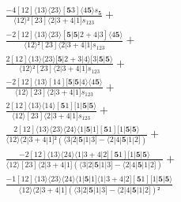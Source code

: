 \documentclass[varwidth, border=5pt]{standalone}
\begin{document}
\begin{my}
$\begin{gathered}
\scriptscriptstyle\frac{-4[12]⟨13⟩⟨23⟩[𝟓3]⟨4𝟓⟩s_{𝟓}}{⟨12⟩²[23]⟨2|3+4|1]s_{123}} +\\
\scriptscriptstyle\frac{-2[12]⟨13⟩⟨23⟩[𝟓|𝟓|2+4|3]⟨4𝟓⟩}{⟨12⟩²[23]⟨2|3+4|1]s_{123}} +\\
\scriptscriptstyle\frac{2[12]⟨13⟩⟨23⟩[𝟓|2+3|4⟩[3|𝟓|𝟓⟩}{⟨12⟩²[23]⟨2|3+4|1]s_{123}} +\\
\scriptscriptstyle\frac{-2[12]⟨13⟩[14][𝟓|𝟓|4⟩⟨4𝟓⟩}{⟨12⟩[23]⟨2|3+4|1]s_{123}} +\\
\scriptscriptstyle\frac{2[12]⟨13⟩⟨14⟩[𝟓1][1|𝟓|𝟓⟩}{⟨12⟩[23]⟨2|3+4|1]s_{123}} +\\
\scriptscriptstyle\frac{2[12]⟨13⟩⟨23⟩⟨24⟩⟨1|𝟓|1][𝟓1][1|𝟓|𝟓⟩}{⟨12⟩⟨2|3+4|1]²(⟨3|2|𝟓|1|3]-⟨2|4|𝟓|1|2])} +\\
\scriptscriptstyle\frac{-2[12]⟨13⟩⟨24⟩⟨1|3+4|2][𝟓1][1|𝟓|𝟓⟩}{⟨12⟩[23]⟨2|3+4|1](⟨3|2|𝟓|1|3]-⟨2|4|𝟓|1|2])} +\\
\scriptscriptstyle\frac{-1[12]⟨13⟩⟨23⟩⟨24⟩⟨1|𝟓|1]⟨1|3+4|2][𝟓1][1|𝟓|𝟓⟩}{⟨12⟩⟨2|3+4|1](⟨3|2|𝟓|1|3]-⟨2|4|𝟓|1|2])²} \phantom{+}
\end{gathered}$
\end{my}
\end{document}
